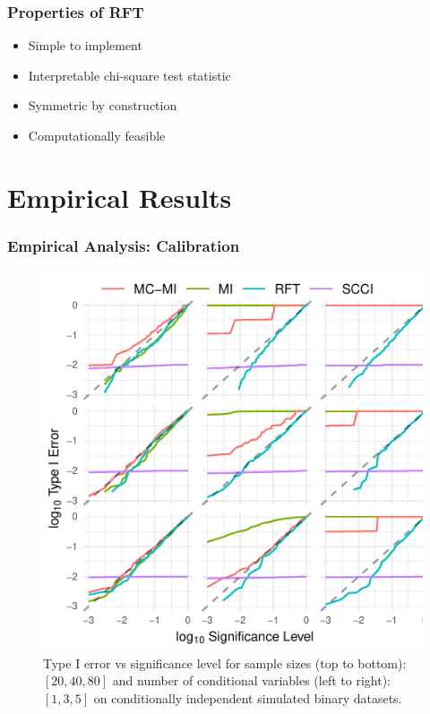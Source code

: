 \documentclass{beamer}
\begin{document}
\begin{frame}
	\frametitle{Properties of RFT}
	\begin{itemize}
		\item Simple to implement
		\item Interpretable chi-square test statistic
		\item Symmetric by construction
		\item Computationally feasible
	\end{itemize}
\end{frame}

\section{Empirical Results}

\begin{frame}
	\frametitle{Empirical Analysis: Calibration}
	\begin{figure}
		\centering
		\includegraphics[scale=0.8]{imgs/calibration_add_vars.pdf}
		\caption*{Type I error vs significance level for sample sizes (top to
		bottom): $ [20, 40, 80] $ and number of conditional variables (left to
		right): $ [1, 3, 5] $ on conditionally independent simulated binary
		datasets.}
	\end{figure}
\end{frame}
\end{document}
